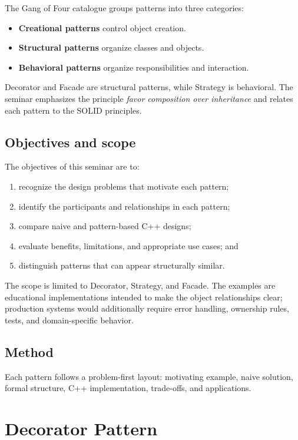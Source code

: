 \documentclass[11pt,a4paper]{report}
\begin{document}
The Gang of Four catalogue groups patterns into three categories:
\begin{itemize}
  \item \textbf{Creational patterns} control object creation.
  \item \textbf{Structural patterns} organize classes and objects.
  \item \textbf{Behavioral patterns} organize responsibilities and interaction.
\end{itemize}

Decorator and Facade are structural patterns, while Strategy is behavioral.
The seminar emphasizes the principle \emph{favor composition over inheritance}
and relates each pattern to the SOLID principles.

\section{Objectives and scope}
The objectives of this seminar are to:
\begin{enumerate}
  \item recognize the design problems that motivate each pattern;
  \item identify the participants and relationships in each pattern;
  \item compare naive and pattern-based C++ designs;
  \item evaluate benefits, limitations, and appropriate use cases; and
  \item distinguish patterns that can appear structurally similar.
\end{enumerate}

The scope is limited to Decorator, Strategy, and Facade. The examples are
educational implementations intended to make the object relationships clear;
production systems would additionally require error handling, ownership rules,
tests, and domain-specific behavior.

\section{Method}
Each pattern follows a problem-first layout: motivating example, naive solution,
formal structure, C++ implementation, trade-offs, and applications.

\chapter{Decorator Pattern}
\end{document}
